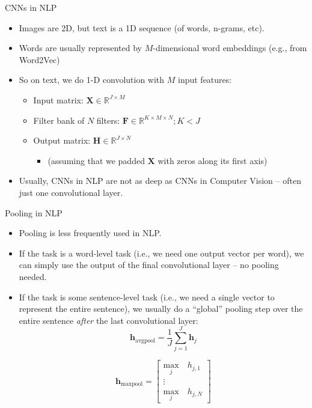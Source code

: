 \begin{vbframe}{CNN\lowercase{s} in NLP}

\vfill

\begin{itemize}
	\item Images are 2D, but text is a 1D sequence (of words, n-grams, etc).
	\item Words are usually represented by $M$-dimensional word embeddings (e.g., from Word2Vec)
	\item So on text, we do 1-D convolution with $M$ input features:
		\begin{itemize}
			\item Input matrix: $\mathbf{X} \in \mathbb{R}^{J \times M}$
			\item Filter bank of $N$ filters: $\mathbf{F} \in \mathbb{R}^{K \times M \times N}; K < J$
			\item Output matrix: $\mathbf{H} \in \mathbb{R}^{J \times N}$ 
				\begin{itemize}
					\item (assuming that we padded $\mathbf{X}$ with zeros along its first axis)
				\end{itemize}
		\end{itemize}
	\item Usually, CNNs in NLP are not as deep as CNNs in Computer Vision -- often just one convolutional layer.
\end{itemize}

\vfill

\end{vbframe}


\begin{vbframe}{Pooling in NLP}

\vfill

\begin{itemize}
\item Pooling is less frequently used in NLP.
\item If the task is a word-level task (i.e., we need one output vector per word), we can simply use the output of the final convolutional layer -- no pooling needed.
\item If the task is some sentence-level task (i.e., we need a single vector to represent the entire sentence), we usually do a ``global'' pooling step over the entire sentence \textit{after} the last convolutional layer:
$$\mathbf{h}_\mathrm{avgpool} = \frac{1}{J} \sum_{j=1}^J \mathbf{h}_j$$

$$\mathbf{h}_\mathrm{maxpool} = \begin{bmatrix} \underset{j}{\mathrm{max}} \quad h_{j,1} \\ \vdots \\ \underset{j}{\mathrm{max}} \quad h_{j,N} \end{bmatrix}$$

\end{itemize}

\vfill

\end{vbframe}

